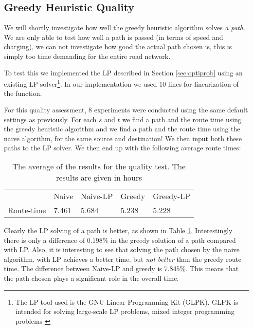 \subsection{Greedy Heuristic Quality}
We will shortly investigate how well the greedy heuristic algorithm solves \emph{a path}. We are only able to test how well a path is passed (in terms of speed and charging), we can not investigate how good the actual path chosen is, this is simply too time demanding for the entire road network.

To test this we implemented the LP described in Section \ref{sec:optiprob} using an existing LP solver\footnote{The LP tool used is the GNU Linear Programming Kit (GLPK). GLPK is intended for solving large-scale LP problems, mixed integer programming problems \cite{glpk}}. In our implementation we used 10 lines for linearization of the function. 

For this quality assessment, 8 experiments were conducted using the same default settings as previously. For each $s$ and $t$ we find a path and the route time using the greedy heuristic algorithm and we find a path and the route time using the naive algorithm, for the same source and destination! We then input both these paths to the LP solver. We then end up with the following average route times:
\begin{table}[!htb]
\begin{tabular}{ p{1cm} p{1.35cm} p{1.35cm} p{1.25cm} p{1.6cm}}
\hline
& Naive & Naive-LP  & Greedy  & Greedy-LP \\
Route-time & 7.461& 5.684 & 5.238 & 5.228\\
\hline
\end{tabular}
\caption{The average of the results for the quality test. The results are given in hours}
\label{tab:LP}
\end{table}

Clearly the LP solving of a path is better, as shown in Table \ref{tab:LP}. Interestingly there is only a difference of $0.198\%$ in the greedy solution of a path compared with LP. Also, it is interesting to see that solving the path chosen by the naive algorithm, with LP achieves a better time, but \emph{not better} than the greedy route time. The difference between Naive-LP and greedy is $7.845\%$. This means that the path chosen plays a significant role in the overall time.